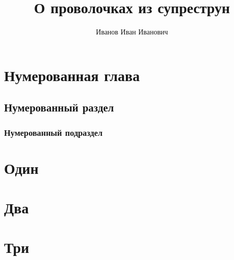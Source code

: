 \documentclass[a4paper,10pt]{report}
\title{О проволочках из супреструн}
\author{Иванов Иван Иванович}
\begin{document}
  \maketitle
  \chapter{Нумерованная глава}
  \label{c:num_chap}
  \lipsum
  \section{Нумерованный раздел}
  \label{s:num_sec}
  \lipsum
  \subsection{Нумерованный подраздел}
  \label{ss:num_subsec}
  \lipsum

  \appendix
  \chapter{Один}
  \lipsum
  \chapter{Два}
  \lipsum
  \chapter{Три}
  \lipsum
\end{document}
